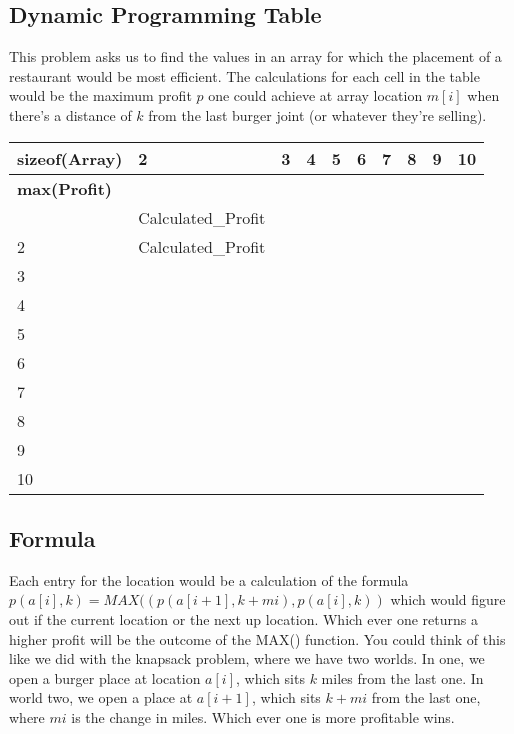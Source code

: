 \documentclass{article}
\begin{document}
\subsection{Dynamic Programming Table}
This problem asks us to find the values in an array for which the placement of a restaurant would be most efficient. The calculations for each cell in the table would be the maximum profit $p$ one could achieve at array location $m[i]$ when there's a distance of $k$ from the last burger joint (or whatever they're selling).
\begin{table}[h]
\begin{tabular}{llllllllll}
\textbf{sizeof(Array)} & 2 & 3 & 4 & 5 & 6 & 7 & 8 & 9 & 10 \\ \hline
\multicolumn{1}{l|}{\textbf{max(Profit)}} &  &  &  &  &  &  &  &  &  \\
\multicolumn{1}{l|}{\textbf{}} & Calculated\_Profit &  &  &  &  &  &  &  &  \\
\multicolumn{1}{l|}{2} & Calculated\_Profit &  &  &  &  &  &  &  &  \\
\multicolumn{1}{l|}{3} &  &  &  &  &  &  &  &  &  \\
\multicolumn{1}{l|}{4} &  &  &  &  &  &  &  &  &  \\
\multicolumn{1}{l|}{5} &  &  &  &  &  &  &  &  &  \\
\multicolumn{1}{l|}{6} &  &  &  &  &  &  &  &  &  \\
\multicolumn{1}{l|}{7} &  &  &  &  &  &  &  &  &  \\
\multicolumn{1}{l|}{8} &  &  &  &  &  &  &  &  &  \\
\multicolumn{1}{l|}{9} &  &  &  &  &  &  &  &  &  \\
\multicolumn{1}{l|}{10} &  &  &  &  &  &  &  &  & 
\end{tabular}
\end{table}
\subsection{Formula} 
Each entry for the location would be a calculation of the formula $p(a[i],k) = MAX( (p(a[i+1],k+mi),p(a[i],k) )$ which would figure out if the current location or the next up location. Which ever one returns a higher profit will be the outcome of the MAX() function. You could think of this like we did with the knapsack problem, where we have two worlds. In one, we open a burger place at location $a[i]$, which sits $k$ miles from the last one. In world two, we open a place at $a[i+1]$, which sits $k+mi$ from the last one, where $mi$ is the change in miles. Which ever one is more profitable wins.
\end{document}
